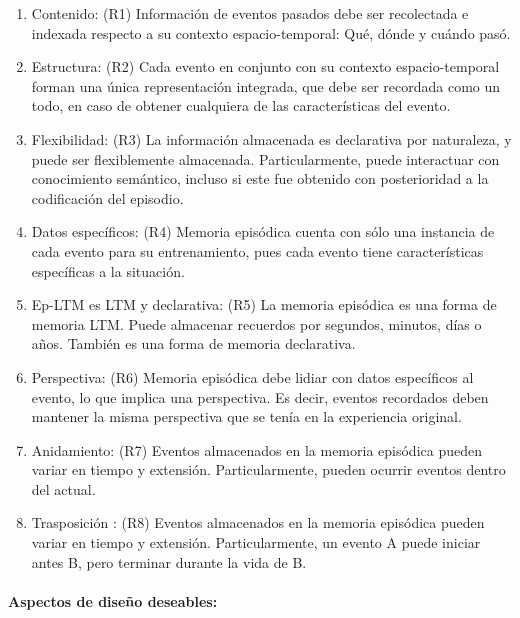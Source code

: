 \begin{enumerate}[topsep=0pt]
\setlength\itemsep{0.2em}
\item Contenido: (R1) Información de eventos pasados debe ser recolectada e indexada respecto a su contexto espacio-temporal: Qué, dónde y cuándo pasó.

\item Estructura: (R2) Cada evento en conjunto con su contexto espacio-temporal forman una única representación integrada, que debe ser recordada como un todo, en caso de obtener cualquiera de las características del evento.

\item Flexibilidad: (R3) La información almacenada es declarativa por naturaleza, y puede ser flexiblemente almacenada. Particularmente, puede interactuar con conocimiento semántico, incluso si este fue obtenido con posterioridad a la codificación del episodio.

\item Datos específicos: (R4) Memoria episódica cuenta con sólo una instancia de cada evento para su entrenamiento, pues cada evento tiene características específicas a la situación.

\item Ep-LTM es LTM y declarativa: (R5) La memoria episódica es una forma de memoria LTM. Puede almacenar recuerdos por segundos, minutos, días o años. También es una forma de memoria declarativa.

\item Perspectiva: (R6) Memoria episódica debe lidiar con datos específicos al evento, lo que implica una perspectiva. Es decir, eventos recordados deben mantener la misma perspectiva que se tenía en la experiencia original.

\item Anidamiento: (R7) Eventos almacenados en la memoria episódica pueden variar en tiempo y extensión. Particularmente, pueden ocurrir eventos dentro del actual.

\item Trasposición : (R8)  Eventos almacenados en la memoria episódica pueden variar en tiempo y extensión. Particularmente, un evento A puede iniciar antes B, pero terminar durante la vida de B.

\end{enumerate}

\paragraph{Aspectos de diseño deseables:}

